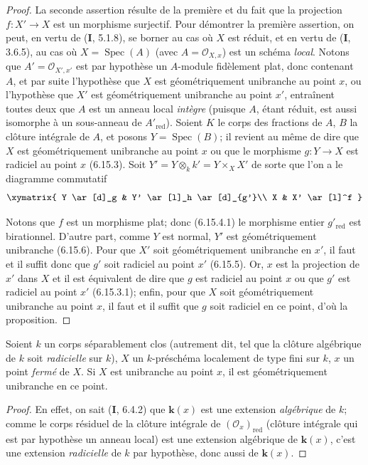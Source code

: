\begin{proof}
La seconde assertion résulte de la première et du fait que la projection
$f:X'\to X$ est un morphisme surjectif. Pour démontrer la première
assertion, on peut, en vertu de (\textbf{I}, 5.1.8), se borner au cas où $X$ est
réduit, et en vertu de (\textbf{I}, 3.6.5), au cas
où $X=\operatorname{Spec}(A)$ (avec $A=\mathcal O_{X,x}$) est un schéma \emph{local}.
Notons que $A'=\mathcal O_{X',x'}$ est par hypothèse un $A$-module
fidèlement plat, donc contenant $A$, et par suite l'hypothèse que $X$ est
géométriquement unibranche au point $x$, ou l'hypothèse que $X'$ est
géométriquement unibranche au point $x'$, entraînent toutes deux que $A$
est un anneau local \emph{intègre} (puisque $A$, étant réduit, est aussi isomorphe
à un sous-anneau de $A'_{\mathrm{red}}$). Soient $K$ le corps des fractions
de $A$, $B$ la clôture intégrale de $A$, et posons
$Y=\operatorname{Spec}(B)$; il revient au même de dire que $X$ est
géométriquement unibranche au point $x$ ou que le morphisme $g:Y\to X$
est radiciel au point $x$ (6.15.3). Soit
$Y'=Y\otimes_k k'=Y\times_X X'$ de sorte que l'on a le diagramme
commutatif
\[
\xymatrix{
Y \ar[d]_g & Y' \ar[l]_h \ar[d]_{g'}\\
X & X' \ar[l]^f
}
\]

Notons que $f$ est un morphisme plat; donc (6.15.4.1) le morphisme entier
$g'_{\mathrm{red}}$ est birationnel. D'autre part, comme $Y$ est normal,
$Y'$ est géométriquement unibranche (6.15.6). Pour que $X'$ soit
géométriquement unibranche en $x'$, il faut et il suffit donc que $g'$
soit radiciel au point $x'$ (6.15.5). Or, $x$ est la projection de $x'$ dans
$X$ et il est équivalent de dire que $g$ est radiciel au point $x$ ou que
$g'$ est radiciel au point $x'$ (6.15.3.1); enfin, pour que $X$ soit
géométriquement unibranche au point $x$, il faut et il suffit que $g$ soit
radiciel en ce point, d'où la proposition.
\end{proof}

\begin{lemma}[6.15.8]
\label{IV.2.s6.15.8-fr}
Soient $k$ un corps séparablement clos \textup{(autrement dit, tel que la clôture
algébrique de $k$ soit \emph{radicielle} sur $k$)}, $X$ un $k$-préschéma localement
de type fini sur $k$, $x$ un point \emph{fermé} de $X$. Si $X$ est unibranche au
point $x$, il est géométriquement unibranche en ce point.
\end{lemma}

\begin{proof}
En effet, on sait (\textbf{I}, 6.4.2) que $\boldsymbol{k}(x)$ est une extension \emph{algébrique} de
$k$; comme le corps résiduel de la clôture intégrale de
$(\mathcal O_x)_{\mathrm{red}}$ (clôture intégrale qui est par
hypothèse un anneau local) est une extension algébrique de $\boldsymbol{k}(x)$, c'est
une extension \emph{radicielle} de $k$ par hypothèse, donc aussi de $\boldsymbol{k}(x)$.
\end{proof}

